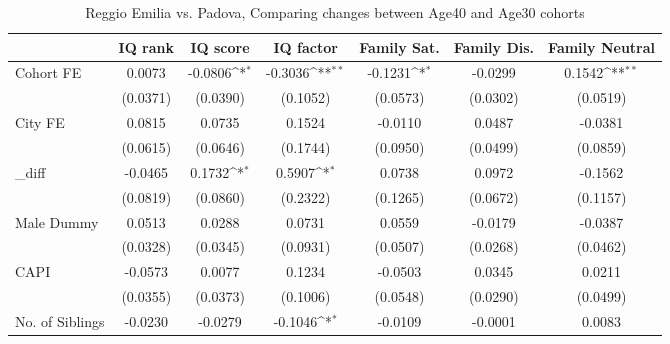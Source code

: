 \begin{table}[htbp]\centering
\def\sym#1{\ifmmode^{#1}\else\(^{#1}\)\fi}
\caption{Reggio Emilia vs. Padova, Comparing changes between Age40 and Age30 cohorts}
\begin{tabular}{l*{6}{c}}
\toprule
            &\multicolumn{1}{c}{IQ rank}&\multicolumn{1}{c}{IQ score}&\multicolumn{1}{c}{IQ factor}&\multicolumn{1}{c}{Family Sat.}&\multicolumn{1}{c}{Family Dis.}&\multicolumn{1}{c}{Family Neutral}\\
\midrule
Cohort FE   &      0.0073         &     -0.0806\sym{*}  &     -0.3036\sym{**} &     -0.1231\sym{*}  &     -0.0299         &      0.1542\sym{**} \\
            &    (0.0371)         &    (0.0390)         &    (0.1052)         &    (0.0573)         &    (0.0302)         &    (0.0519)         \\
\addlinespace
City FE     &      0.0815         &      0.0735         &      0.1524         &     -0.0110         &      0.0487         &     -0.0381         \\
            &    (0.0615)         &    (0.0646)         &    (0.1744)         &    (0.0950)         &    (0.0499)         &    (0.0859)         \\
\addlinespace
\_diff       &     -0.0465         &      0.1732\sym{*}  &      0.5907\sym{*}  &      0.0738         &      0.0972         &     -0.1562         \\
            &    (0.0819)         &    (0.0860)         &    (0.2322)         &    (0.1265)         &    (0.0672)         &    (0.1157)         \\
\addlinespace
Male Dummy  &      0.0513         &      0.0288         &      0.0731         &      0.0559         &     -0.0179         &     -0.0387         \\
            &    (0.0328)         &    (0.0345)         &    (0.0931)         &    (0.0507)         &    (0.0268)         &    (0.0462)         \\
\addlinespace
CAPI        &     -0.0573         &      0.0077         &      0.1234         &     -0.0503         &      0.0345         &      0.0211         \\
            &    (0.0355)         &    (0.0373)         &    (0.1006)         &    (0.0548)         &    (0.0290)         &    (0.0499)         \\
\addlinespace
No. of Siblings&     -0.0230         &     -0.0279         &     -0.1046\sym{*}  &     -0.0109         &     -0.0001         &      0.0083         \\

\end{tabular}
\end{table}
